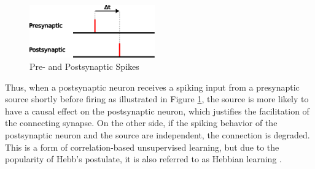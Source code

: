 \begin{figure}
    \begin{center}
        \includegraphics[width=0.48\textwidth]{Figures/pre_post_spikes.pdf}
    \end{center}
\caption{Pre- and Postsynaptic Spikes}
\label{fig:pre_post_spikes}
\end{figure}
Thus, when a postsynaptic neuron receives a spiking input from a presynaptic source shortly before firing as illustrated in Figure \ref{fig:pre_post_spikes}, the source is more likely to have a causal effect on the postsynaptic neuron, which justifies the facilitation of the connecting synapse. On the other side, if the spiking behavior of the postsynaptic neuron and the source are independent, the connection is degraded. This is a form of correlation-based unsupervised learning, but due to the popularity of Hebb's postulate, it is also referred to as Hebbian learning \parencite{morrison_diesmann_gerstner_2008}.
